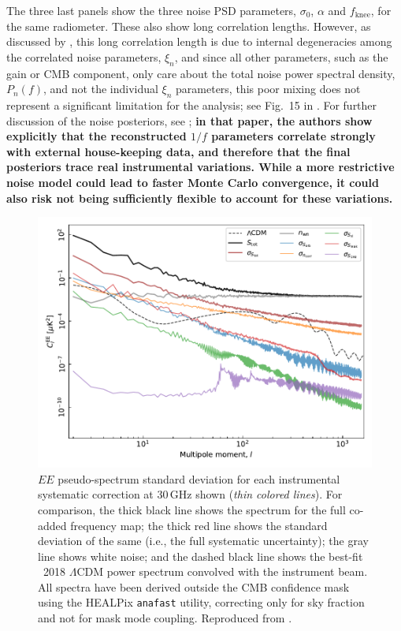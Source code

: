 \documentclass[twocolumn]{aa}
\begin{document}
The three last panels show the three noise PSD parameters, $\sigma_0$,
$\alpha$ and $f_{\mathrm{knee}}$, for the same radiometer. These also
show long correlation lengths. However, as discussed by
\citet{bp04,bp06}, this long correlation length is due to internal
degeneracies among the correlated noise parameters, $\xi_n$, and since
all other parameters, such as the gain or CMB component, only care
about the total noise power spectral density, $P_n(f)$, and not the
individual $\xi_n$ parameters, this poor mixing does not represent a
significant limitation for the analysis; see Fig.~15 in
\citet{bp04}. For further discussion of the noise posteriors, see
\citet{bp06}; {\bf in that paper, the authors show explicitly that the reconstructed $1/f$ parameters correlate strongly with external house-keeping data, and therefore that the final posteriors trace real instrumental variations. While a more restrictive noise model could lead to faster Monte Carlo convergence, it could also risk not being sufficiently flexible to account for these variations.}

\begin{figure}[t]
  \center
  \includegraphics[width=\linewidth]{figs/30GHz_EE_power_spectra.pdf}
  \caption{$EE$ pseudo-spectrum standard deviation for each
    instrumental systematic correction at 30\,GHz shown (\emph{thin
      colored lines}). For comparison, the thick black line shows the
    spectrum for the full co-added frequency map; the thick red line
    shows the standard deviation of the same (i.e., the full
    systematic uncertainty); the gray line shows white noise; and the
    dashed black line shows the best-fit \Planck\ 2018 $\Lambda$CDM
    power spectrum convolved with the instrument beam. All spectra
    have been derived outside the CMB confidence mask \citep{bp13}
    using the HEALPix \texttt{anafast} utility, correcting only for
    sky fraction and not for mask mode coupling. Reproduced from
    \citep{bp10}. \label{fig:corrmap_powspec_stddev} }
\end{figure}
\end{document}
